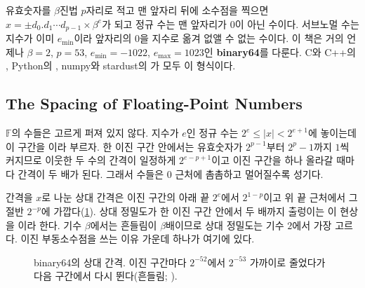 유효숫자를 $\beta$진법 $p$자리로 적고 맨 앞자리 뒤에 소수점을 찍으면 $x=\pm d_0.d_1\cdots d_{p-1}\times\beta^e$가 되고 정규 수는 맨 앞자리가 $0$이 아닌 수이다. 서브노멀 수는 지수가 이미 $e_{\min}$이라 앞자리의 $0$을 지수로 옮겨 없앨 수 없는 수이다. 이 책은 거의 언제나 $\beta=2$, $p=53$, $e_{\min}=-1022$, $e_{\max}=1023$인 \textbf{binary64}를 다룬다. C와 C++의 , Python의 , numpy와 stardust의 가 모두 이 형식이다\cite{ieee754-2019}.

\subsection{The Spacing of Floating-Point Numbers}

$\mathbb F$의 수들은 고르게 퍼져 있지 않다. 지수가 $e$인 정규 수는 $2^e\le|x|<2^{e+1}$에 놓이는데 이 구간을 이라 부르자. 한 이진 구간 안에서는 유효숫자가 $2^{p-1}$부터 $2^p-1$까지 $1$씩 커지므로 이웃한 두 수의 간격이 일정하게 $2^{e-p+1}$이고 이진 구간을 하나 올라갈 때마다 간격이 두 배가 된다. 그래서 수들은 $0$ 근처에 촘촘하고 멀어질수록 성기다.

간격을 $x$로 나눈 상대 간격은 이진 구간의 아래 끝 $2^e$에서 $2^{1-p}$이고 위 끝 근처에서 그 절반 $2^{-p}$에 가깝다(\cref{fig:spacing}). 상대 정밀도가 한 이진 구간 안에서 두 배까지 출렁이는 이 현상을 이라 한다. 기수 $\beta$에서는 흔들림이 $\beta$배이므로 상대 정밀도는 기수 $2$에서 가장 고르다. 이진 부동소수점을 쓰는 이유 가운데 하나가 여기에 있다\cite{goldberg1991}.

\begin{figure}[htbp]
\centering
{}
\caption{binary64의 상대 간격. 이진 구간마다 $2^{-52}$에서 $2^{-53}$ 가까이로 줄었다가 다음 구간에서 다시 뛴다(흔들림; ).}
\label{fig:spacing}
\end{figure}

